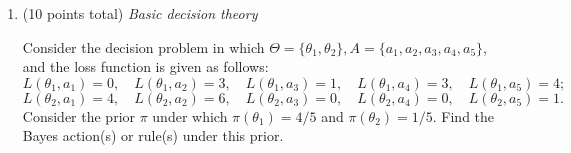 \documentclass{article}
\begin{document}
\begin{enumerate}
\item  (10 points total) {\em Basic decision theory}

Consider the decision problem in which $\Theta = \{ \theta_1, \theta_2\}, 
A = \{a_1, a_2, a_3, a_4, a_5\}$, and the loss function is given as follows: 
$$L(\theta_1, a_1) = 0,\quad L(\theta_1, a_2) = 3,\quad L(\theta_1, a_3) = 1,\quad L(\theta_1, a_4) = 3,\quad
L(\theta_1, a_5) = 4;$$ 
$$L(\theta_2, a_1) = 4,\quad L(\theta_2, a_2) = 6,\quad L(\theta_2, a_3) = 0,\quad L(\theta_2, a_4) = 0,\quad
L(\theta_2, a_5) = 1.$$
Consider the prior $\pi$ under which $\pi(\theta_1) = 4/5$ and $\pi(\theta_2) = 1/5.$ Find the Bayes action(s) or rule(s) under this prior. 


    \end{enumerate}
\end{document}
